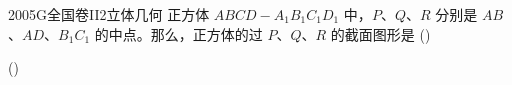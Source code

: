 
\begin{problem}{2005}{G}{全国卷II}{2}{立体几何}
正方体 $ ABCD-A_1B_1C_1D_1 $ 中，$ P $、$ Q $、$ R $ 分别是 $ AB $、$ AD $、$ B_1C_1 $ 的中点。那么，正方体的过 $ P $、$ Q $、$ R $ 的截面图形是 (\hspace{1cm})

(\hspace{1cm})
\begin{choices}
\end{choices}
\end{problem}

\begin{answer}

\end{answer}

\begin{solutions}

\end{solutions}